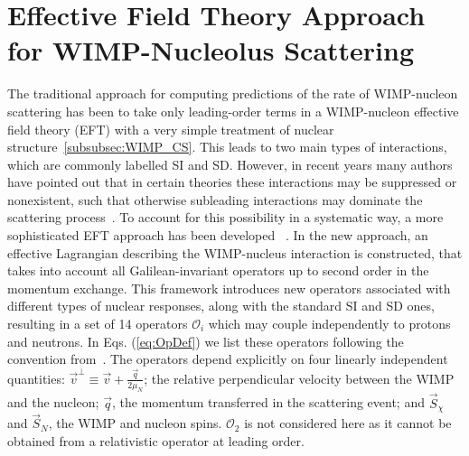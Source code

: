 \section{Effective Field Theory Approach for WIMP-Nucleolus Scattering}
\label{sec:intro_EFT}

The traditional approach for computing predictions of the rate of WIMP-nucleon scattering has been to take only leading-order terms in a WIMP-nucleon effective field theory (EFT) with a very simple treatment of nuclear structure~\ref{subsubsec:WIMP_CS}. This leads to two main types of interactions, which are commonly labelled SI and SD. However, in recent years many authors have pointed out that in certain theories these interactions may be suppressed or nonexistent, such that otherwise subleading interactions may dominate the scattering process~\cite{Chang:2009yt}. To account for this possibility in a systematic way, a more sophisticated EFT approach has been developed ~\cite{Fitzpatrick:2012ib,Anand:MathTools,Fitzpatrick:MathTools}. In the new approach, an effective Lagrangian describing the WIMP-nucleus interaction is constructed, that takes into account all Galilean-invariant operators up to second order in the momentum exchange. This framework introduces new operators associated with different types of nuclear responses, along with the standard SI and SD ones, resulting in a set of 14 operators $\mathcal{O}_i$ which may couple independently to protons and neutrons. In Eqs. (\ref{eq:OpDef}) we list these operators following the convention from~\cite{Anand:MathTools}. The operators depend explicitly on four linearly independent quantities: $\vec{v}^{\perp} \equiv \vec{v} + \frac{\vec{q}}{2\mu_N} $; the relative perpendicular velocity between the WIMP and the nucleon; $\vec{q}$, the momentum transferred in the scattering event; and $\vec{S}_\chi$ and $\vec{S}_N$, the WIMP and nucleon spins. $\mathcal{O}_2$ is not considered here as it cannot be obtained from a relativistic operator at leading order.
%

